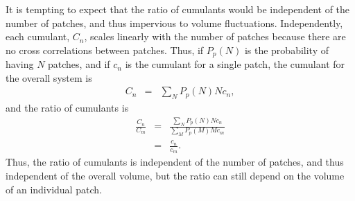 It is tempting to expect that the ratio of cumulants would be independent of the number of patches, and thus impervious to volume fluctuations. Independently, each cumulant, $C_n$, scales linearly with the number of patches because there are no cross correlations between patches. Thus,
if $P_p(N)$ is the probability of having $N$ patches, and if $c_n$ is the cumulant for a single patch, the cumulant for the overall system is
\begin{eqnarray}
\label{eq:patchprob}
C_n&=&\sum_NP_p(N) Nc_n,
\end{eqnarray}
and the ratio of cumulants is 
\begin{eqnarray}
\frac{C_n}{C_m}&=&\frac{\sum_NP_p(N)Nc_n}{\sum_MP_p(M)Mc_m}\\
\nonumber
&=&\frac{c_n}{c_m}.
\end{eqnarray}
Thus, the ratio of cumulants is independent of the number of patches, and thus independent of the overall volume, but the ratio can still depend on the volume of an individual patch.

